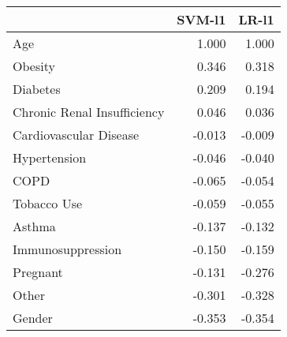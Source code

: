 \begin{tabular}{lrr}
\toprule
{} &  SVM-l1 &  LR-l1 \\
\midrule
Age                         &   1.000 &  1.000 \\
Obesity                     &   0.346 &  0.318 \\
Diabetes                    &   0.209 &  0.194 \\
Chronic Renal Insufficiency &   0.046 &  0.036 \\
Cardiovascular Disease      &  -0.013 & -0.009 \\
Hypertension                &  -0.046 & -0.040 \\
COPD                        &  -0.065 & -0.054 \\
Tobacco Use                 &  -0.059 & -0.055 \\
Asthma                      &  -0.137 & -0.132 \\
Immunosuppression           &  -0.150 & -0.159 \\
Pregnant                    &  -0.131 & -0.276 \\
Other                       &  -0.301 & -0.328 \\
Gender                      &  -0.353 & -0.354 \\
\bottomrule
\end{tabular}
